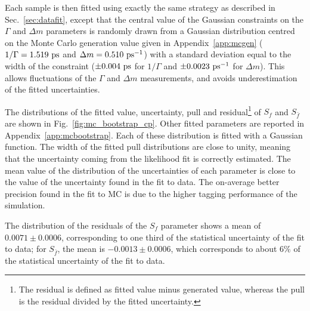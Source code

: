 Each sample is then fitted using exactly the same strategy as described in Sec.~\ref{sec:datafit}, except
that the central value of the Gaussian constraints on the $\Gamma$ and $\Delta m$ parameters is randomly
drawn from a Gaussian distribution centred on the Monte Carlo generation value given in Appendix~\ref{app:mcgen}
($1/\Gamma=1.519~\rm ps$ and $\Delta m = 0.510~\rm ps^{-1}$) with a standard deviation equal to the 
width of the constraint ($\pm 0.004~\rm ps$ for $1/\Gamma$ and $\pm 0.0023~\rm ps^{-1}$ for $\Delta m$).
This allows
fluctuations of the $\Gamma$ and $\Delta m$ measurements, and avoids underestimation of the fitted uncertainties.

The distributions of the fitted value, uncertainty, pull and residual\footnote{The residual is defined
as fitted value minus generated value, whereas the pull is the residual divided by the fitted uncertainty.} of $S_f$ and
$S_{\bar f}$ are shown in Fig.~\ref{fig:mc_bootstrap_cp}. Other fitted parameters are reported in Appendix~\ref{app:mcbootstrap}. 
Each of these distribution is fitted
with a Gaussian function. The width of the fitted pull distributions are close to unity, meaning that the uncertainty coming from
the likelihood fit is correctly estimated. The mean value of the distribution of the uncertainties of each
parameter is close to the value of the uncertainty found in the fit to data. The on-average better precision found in the fit
to MC is due to the higher tagging performance of the simulation.

The distribution of the residuals of the $S_{f}$ parameter shows a mean of
$0.0071\pm0.0006$, corresponding to one third of the statistical uncertainty of the fit to data;
for $S_{\bar f}$, the mean is $-0.0013\pm0.0006$, which corresponds to about $6\%$ of the statistical uncertainty of the fit to data.

